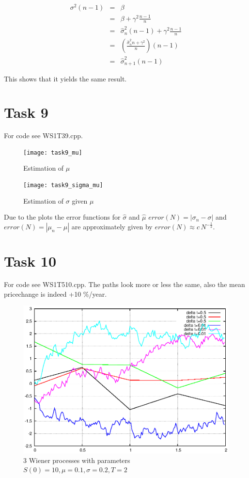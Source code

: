 \documentclass[]{article}
\begin{document}
\begin{eqnarray*}
      \sigma^2 \left(n-1\right) & = & \beta \\
      & = & \beta + \gamma^2\frac{n-1}{n}\\
      & = & \hat{\sigma}^{2}_n\left(n-1\right) + \gamma^2\frac{n-1}{n}\\
      & = & \left(\frac{\hat{\sigma}^{2}_n n+\gamma^2}{n}\right)\left(n-1\right)
      \\
      & = & \hat{\sigma}^{2}_{n+1}\left(n-1\right)
\end{eqnarray*} 

This shows that it yields the same result.

\section*{Task 9} For code see WS1T39.cpp.\\

\begin{figure}[!ht]
\centering
\texttt{[image: task9\_mu]}
\caption{Estimation of $\mu$}
\label{fig:Task9a}
\end{figure}

\begin{figure}[!ht]
\centering
\texttt{[image: task9\_sigma\_mu]}
\caption{Estimation of $\sigma$ given $\mu$}
\label{fig:Task9b}
\end{figure}

Due to the plots the error functions for $\hat{\sigma}$ and $\hat{\mu}$
$error(N) = \left|\sigma_n - \sigma\right| $ and $error(N) = \left|\mu_n -
\mu\right| $ are approximately given by $error(N) \approx c\,N^{-\frac{1}{2}}$.


\section*{Task 10} For code see WS1T510.cpp. The paths look more or less the same, also the mean pricechange is indeed +10
\%/year.\\

\begin{figure}[!ht]
\centering
\includegraphics{task10_w}
\caption{3 Wiener processes with parameters $S(0)=10,\mu=0.1,\sigma=0.2,T=2$}
\label{fig:Task10a}
\end{figure}
\end{document}
